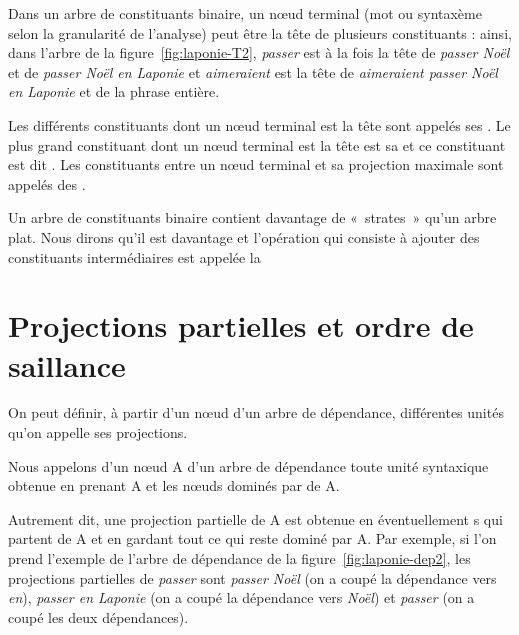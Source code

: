 Dans un arbre de constituants binaire, un nœud terminal (mot ou syntaxème selon la granularité de l’analyse) peut être la tête de plusieurs constituants : ainsi, dans l'arbre de la figure~\ref{fig:laponie-T2}, \textit{passer} est à la fois la tête de \textit{passer Noël} et de \textit{passer Noël en Laponie} et \textit{aimeraient} est la tête de \textit{aimeraient passer Noël en Laponie} et de la phrase entière. 

{Les différents constituants dont un nœud terminal est la tête sont appelés ses . Le plus grand constituant dont un nœud terminal est la tête est sa  et ce constituant est dit . Les constituants entre un nœud terminal et sa projection maximale sont appelés des .}

{Un arbre de constituants binaire contient davantage de «~strates~» qu’un arbre plat. Nous dirons qu’il est davantage  et l’opération qui consiste à ajouter des constituants intermédiaires est appelée la }

\section{Projections partielles et ordre de saillance}\label{sec:3.4.15}

On peut définir, à partir d'un nœud d'un arbre de dépendance, différentes unités qu'on appelle ses projections. 

{Nous appelons  d’un nœud A d'un arbre de dépendance toute unité syntaxique obtenue en prenant A et les nœuds dominés par  de A.}

Autrement dit, une projection partielle de A est obtenue en  éventuellement s qui partent de A et en gardant tout ce qui reste dominé par A. Par exemple, si l'on prend l'exemple de l'arbre de dépendance de la figure~\ref{fig:laponie-dep2}, les projections partielles de \textit{passer} sont \textit{passer Noël} (on a coupé la dépendance vers \textit{en}), \textit{passer en Laponie} (on a coupé la dépendance vers \textit{Noël}) et \textit{passer} (on a coupé les deux dépendances).


